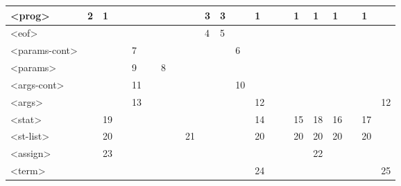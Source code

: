 \documentclass[11pt,a4paper]{article}
\begin{document}
\begin{table}[h!]
\begin{tabular}{|l|l|l|l|l|l|l|l|l|l|l|l|l|l|l|l|l|l|l|l|l|}
        \textless{}prog\textgreater{}        & 2        & 1         &       &       &      &        &       &       & 3                 & 3     &       & 1     &   &   & 1     & 1                             & 1     &        & 1        &         \\ \hline
        \textless{}eof\textgreater{}         &          &           &       &       &      &        &       &       & 4                 & 5     &       &       &   &   &       &                               &       &        &          &         \\ \hline
        \textless{}params-cont\textgreater{} &          &           &       & 7     &      &        &       &       &                   &       & 6     &       &   &   &       &                               &       &        &          &         \\ \hline
        \textless{}params\textgreater{}      &          &           &       & 9     &      & 8      &       &       &                   &       &       &       &   &   &       &                               &       &        &          &         \\ \hline
        \textless{}args-cont\textgreater{}   &          &           &       & 11    &      &        &       &       &                   &       & 10    &       &   &   &       &                               &       &        &          &         \\ \hline
        \textless{}args\textgreater{}        &          &           &       & 13    &      &        &       &       &                   &       &       & 12    &   &   &       &                               &       &        &          & 12      \\ \hline
        \textless{}stat\textgreater{}        &          & 19        &       &       &      &        &       &       &                   &       &       & 14    &   &   & 15    & 18                            & 16    &        & 17       &         \\ \hline
        \textless{}st-list\textgreater{}     &          & 20        &       &       &      &        &       & 21    &                   &       &       & 20    &   &   & 20    & 20                            & 20    &        & 20       &         \\ \hline
        \textless{}assign\textgreater{}      &          & 23        &       &       &      &        &       &       &                   &       &       &       &   &   &       & 22                            &       &        &          &         \\ \hline
        \textless{}term\textgreater{}        &          &           &       &       &      &        &       &       &                   &       &       & 24    &   &   &       &                               &       &        &          & 25      \\ \hline
    \end{tabular}
    \end{table}
\end{document}
